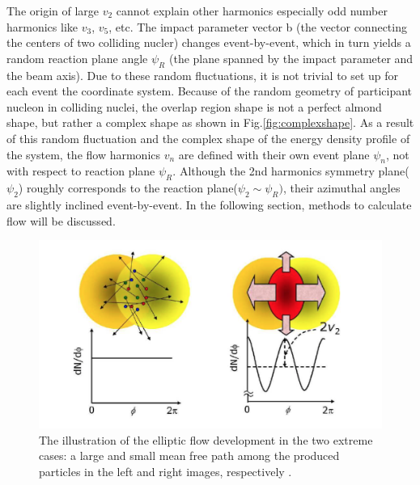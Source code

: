 	The origin of large $v_2$ cannot explain other harmonics especially odd number harmonics like $v_3$, $v_5$, etc. The impact parameter vector b (the vector connecting the centers of two colliding nucler) changes event-by-event, which in turn yields a random reaction plane angle $\psi_R$ (the plane spanned by the impact parameter and the beam axis). Due to these random fluctuations, it is not trivial to set up for each event the coordinate system. Because of the random geometry of participant nucleon in colliding nuclei, the overlap region shape is not a perfect almond shape, but rather a complex shape as shown in Fig.\ref{fig:complexshape}. As a result of this random fluctuation and the complex shape of the energy density profile of the system, the flow harmonics $v_n$ are defined with their own event plane $\psi_n$, not with respect to reaction plane $\psi_R$. Although the 2nd harmonics symmetry plane($\psi_2$) roughly corresponds to the reaction plane($\psi_2 \sim \psi_R)$, their azimuthal angles are slightly inclined event-by-event. In the following section, methods to calculate flow will be discussed.
		

\begin{figure}[h]
\centerline{\includegraphics[width=13.0cm]{figures/v2explin}}
\caption{The illustration of the elliptic flow development in the two extreme cases: a large and small mean free path among the produced particles in the left and right images, respectively \cite{Voloshin:2008dg}.}
\label{fig5}
\end{figure}

